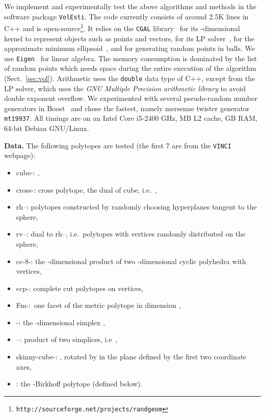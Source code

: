 \documentclass[11pt,a4paper]{article}
\begin{document}
We implement and experimentally test the above algorithms and methods in the 
software package {\tt VolEsti}.
The code currently consists of around 2.5K lines in C++ and is
open-source\footnote{\tt http://sourceforge.net/projects/randgeom}.
It relies on the {\tt CGAL} library~\cite{CGAL} for its -dimensional kernel
to represent objects such as points and vectors,
for its LP solver~\cite{CGAL_LPSolver},
for the approximate minimum ellipsoid~\cite{CgalBoundingVolumes},
and for generating random points in balls.
We use {\tt Eigen}~\cite{eigenlib} for linear algebra.
The memory consumption is dominated by the list of random points
which needs  space during the entire execution
of the algorithm (Sect.~\ref{sec:vol}). 
Arithmetic uses the {\tt double} data type of C++,
except from the LP solver, which uses the
\emph{GNU Multiple Precision arithmetic library} to avoid double exponent
overflow. We experimented with several pseudo-random number generators in
Boost~\cite{Boostrandom} and chose the fastest, namely mersenne twister generator {\tt mt19937}.
All timings are on an Intel Core i5-2400 GHz, MB L2 cache,
GB RAM, 64-bit Debian GNU/Linux.

\vspace{.5em}
\textbf{Data.}
The following polytopes are tested (the first 7 are from the {\tt VINCI} 
webpage):\vspace{-.2cm}
\begin{itemize}\itemsep-.3em
\item cube-:  ,
\item cross-: cross polytope, the dual of cube, i.e.\
,
\item rh--: polytopes constructed by randomly choosing  hyperplanes tangent to the sphere, \item rv--: dual to rh--, i.e.\ polytopes with  vertices randomly distributed on the sphere,
\item cc-8-: the -dimensional product of two -dimensional cyclic polyhedra with  vertices, \item ccp-: complete cut polytopes on  vertices,
\item Fm-:\ one facet of the metric polytope in dimension ,
\item -: the -dimensional simplex ,
\item --: product of two simplices, i.e\ ,
\item skinny-cube-:  , 
rotated by  in the plane defined by the first two coordinate axes,
\item : the -Birkhoff polytope (defined below).
\end{itemize}
\end{document}
